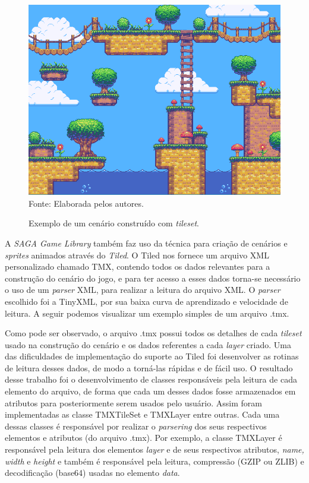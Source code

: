 %
%
%
\begin{figure}[H]
    \centering
    \caption{Exemplo de um cenário construído com \textit{tileset}.}
    \label{cenario}
    \includegraphics[scale = 0.65]{Imagens/cenario.png}
    \\Fonte: Elaborada pelos autores.
\end{figure}
%
%
%
%
\par 
A \textit{SAGA Game Library} também faz uso da técnica para criação de cenários e \textit{sprites} animados através do \textit{Tiled}. O Tiled nos fornece um arquivo XML personalizado chamado TMX, contendo todos os dados relevantes para a construção do cenário do jogo, e para ter acesso a esses dados torna-se necessário o uso de um \textit{parser} XML, para realizar a leitura do arquivo XML. O \textit{parser} escolhido foi a TinyXML, por sua baixa curva de aprendizado e velocidade de leitura. A seguir podemos visualizar um exemplo simples de um arquivo .tmx.
%
%

%
\par 
Como pode ser observado, o arquivo .tmx possui todos os detalhes de cada \textit{tileset} usado na construção do cenário e os dados referentes a cada \textit{layer} criado. Uma das dificuldades de implementação do suporte ao Tiled foi desenvolver as rotinas de leitura desses dados, de modo a torná-las rápidas e de fácil uso. O resultado desse trabalho foi o desenvolvimento de classes responsáveis pela leitura de cada elemento do arquivo, de forma que cada um desses dados fosse armazenados em atributos para posteriormente serem usados pelo usuário. Assim foram implementadas as classe TMXTileSet e TMXLayer entre outras. Cada uma dessas classes é responsável por realizar o \textit{parsering} dos seus respectivos elementos e atributos (do arquivo .tmx). Por exemplo, a classe TMXLayer é responsável pela leitura dos elementos \textit{layer} e de seus respectivos atributos, \textit{name, width} e \textit{height} e também é responsável pela leitura, compressão (GZIP ou ZLIB) e decodificação (base64) usadas no elemento \textit{data}.
